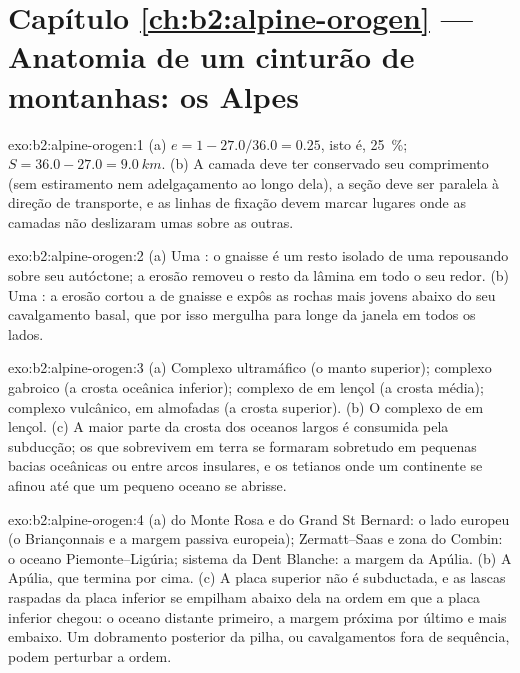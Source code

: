 \section*{Capítulo \ref{ch:b2:alpine-orogen} --- Anatomia de um cinturão de montanhas: os Alpes}

\begin{solution}{exo:b2:alpine-orogen:1}
(a) $e = 1 - 27.0/36.0 = 0.25$, isto é, \qty{25}{\percent}; $S = 36.0 - 27.0 =
\qty{9.0}{km}$. (b) A camada deve ter conservado seu comprimento (sem estiramento nem adelgaçamento ao longo dela),
a seção deve ser paralela à direção de transporte, e as linhas de fixação devem marcar lugares
onde as camadas não deslizaram umas sobre as outras.
\end{solution}

\begin{solution}{exo:b2:alpine-orogen:2}
(a) Uma : o gnaisse é um resto isolado de uma  repousando sobre seu autóctone;
a erosão removeu o resto da lâmina em todo o seu redor. (b) Uma : a erosão
cortou a  de gnaisse e expôs as rochas mais jovens abaixo do seu cavalgamento basal, que
por isso mergulha para longe da janela em todos os lados.
\end{solution}

\begin{solution}{exo:b2:alpine-orogen:3}
(a) Complexo ultramáfico (o manto superior); complexo gabroico (a crosta oceânica inferior);
complexo de  em lençol (a crosta média); complexo vulcânico, em almofadas (a crosta superior).
(b) O complexo de  em lençol. (c) A maior parte da crosta dos oceanos largos é consumida pela subducção;
os  que sobrevivem em terra se formaram sobretudo em pequenas bacias oceânicas ou entre arcos
insulares, e os tetianos onde um continente se afinou até que um pequeno oceano se abrisse.
\end{solution}

\begin{solution}{exo:b2:alpine-orogen:4}
(a)  do Monte Rosa e do Grand St Bernard: o lado europeu (o Briançonnais e a
margem passiva europeia); Zermatt--Saas e zona do Combin: o oceano Piemonte--Ligúria; sistema da Dent
Blanche: a margem da Apúlia. (b) A Apúlia, que termina por cima. (c) A placa superior não é
subductada, e as lascas raspadas da placa inferior se empilham abaixo dela na ordem em que a
placa inferior chegou: o oceano distante primeiro, a margem próxima por último e mais embaixo. Um dobramento posterior da pilha,
ou cavalgamentos fora de sequência, podem perturbar a ordem.
\end{solution}

